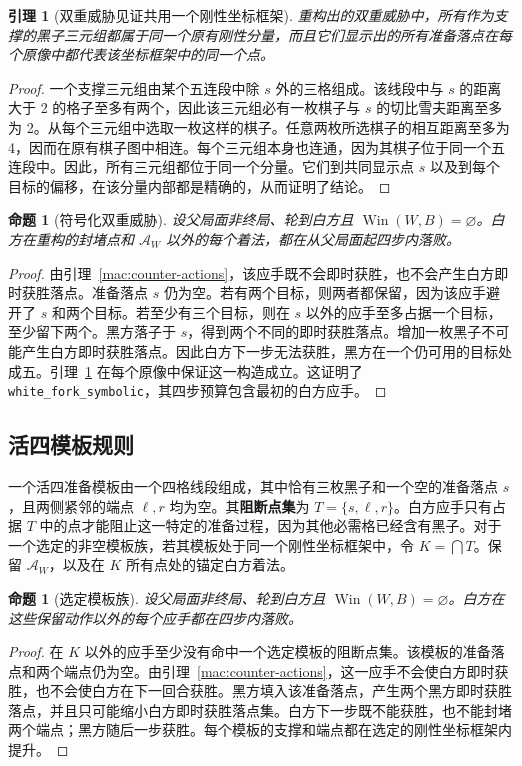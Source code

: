 \documentclass[11pt]{article}
\newtheorem{lemma}[theorem]{引理}
\newtheorem{proposition}[theorem]{命题}
\theoremstyle{definition}
\theoremstyle{remark}
\newcommand{\Win}{\operatorname{Win}}
\begin{document}
\begin{lemma}[双重威胁见证共用一个刚性坐标框架]\label{mac:fork-frame}
重构出的双重威胁中，所有作为支撑的黑子三元组都属于同一个原有刚性分量，而且它们显示出的所有准备落点在每个原像中都代表该坐标框架中的同一个点。

\end{lemma}
\begin{proof}
一个支撑三元组由某个五连段中除 \(s\) 外的三格组成。该线段中与 \(s\) 的距离大于 2 的格子至多有两个，因此该三元组必有一枚棋子与 \(s\) 的切比雪夫距离至多为 2。从每个三元组中选取一枚这样的棋子。任意两枚所选棋子的相互距离至多为 4，因而在原有棋子图中相连。每个三元组本身也连通，因为其棋子位于同一个五连段中。因此，所有三元组都位于同一个分量。它们到共同显示点 \(s\) 以及到每个目标的偏移，在该分量内部都是精确的，从而证明了结论。
\end{proof}

\begin{proposition}[符号化双重威胁]\label{mac:fork}
设父局面非终局、轮到白方且 \(\Win(W,B)=\varnothing\)。白方在重构的封堵点和 \(\mathcal A_W\) 以外的每个着法，都在从父局面起四步内落败。

\end{proposition}
\begin{proof}
由引理~\ref{mac:counter-actions}，该应手既不会即时获胜，也不会产生白方即时获胜落点。准备落点 \(s\) 仍为空。若有两个目标，则两者都保留，因为该应手避开了 \(s\) 和两个目标。若至少有三个目标，则在 \(s\) 以外的应手至多占据一个目标，至少留下两个。黑方落子于 \(s\)，得到两个不同的即时获胜落点。增加一枚黑子不可能产生白方即时获胜落点。因此白方下一步无法获胜，黑方在一个仍可用的目标处成五。引理~\ref{mac:fork-frame} 在每个原像中保证这一构造成立。这证明了 \texttt{white\_fork\_symbolic}，其四步预算包含最初的白方应手。
\end{proof}

\subsection{活四模板规则}

一个活四准备模板由一个四格线段组成，其中恰有三枚黑子和一个空的准备落点 \(s\)，且两侧紧邻的端点 \(\ell,r\) 均为空。其\textbf{阻断点集}为 \(T=\{s,\ell,r\}\)。白方应手只有占据 \(T\) 中的点才能阻止这一特定的准备过程，因为其他必需格已经含有黑子。对于一个选定的非空模板族，若其模板处于同一个刚性坐标框架中，令 \(K=\bigcap T\)。保留 \(\mathcal A_W\)，以及在 \(K\) 所有点处的锚定白方着法。

\begin{proposition}[选定模板族]\label{mac:template-family}
设父局面非终局、轮到白方且 \(\Win(W,B)=\varnothing\)。白方在这些保留动作以外的每个应手都在四步内落败。

\end{proposition}
\begin{proof}
在 \(K\) 以外的应手至少没有命中一个选定模板的阻断点集。该模板的准备落点和两个端点仍为空。由引理~\ref{mac:counter-actions}，这一应手不会使白方即时获胜，也不会使白方在下一回合获胜。黑方填入该准备落点，产生两个黑方即时获胜落点，并且只可能缩小白方即时获胜落点集。白方下一步既不能获胜，也不能封堵两个端点；黑方随后一步获胜。每个模板的支撑和端点都在选定的刚性坐标框架内提升。
\end{proof}
\end{document}
